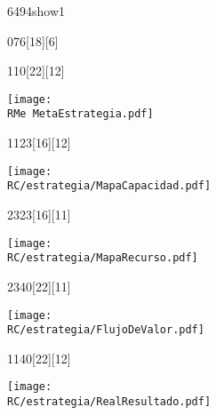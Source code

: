 \begin{NuevaPagina}{64}{94}{show1}
	\CabeceraDePoster{\MATERIA} 
	\begin{NuevoParrafo}{0}{76}[18][6]
		\begin{Marco}[\LineaSupC][\LineaInfC][\LineaIzqC][\LineaDerC][CBlanco]
		\end{Marco}
	\end{NuevoParrafo} 
	\CiudadFechaVolumen
	\begin{NuevoParrafo}{11}{0}[22][12]
		\begin{Marco}[\LineaSupC][\LineaInfC][\LineaIzqC][\LineaDerC][CBlanco]
			\centering\texttt{[image: \\RMe MetaEstrategia.pdf]}		
		\end{Marco}
	\end{NuevoParrafo}	
	\begin{NuevoParrafo}{11}{23}[16][12]
		\begin{Marco}[\LineaSupC][\LineaInfC][\LineaIzqC][\LineaDerC][CBlanco]
			\subseccionC{\PVMaC}%
			\centering\texttt{[image: \\RC/estrategia/MapaCapacidad.pdf]}		
		\end{Marco}
	\end{NuevoParrafo}	
	\begin{NuevoParrafo}{23}{23}[16][11]
		\begin{Marco}[\LineaSupC][\LineaInfC][\LineaIzqC][\LineaDerC][CBlanco]
			\subseccionC{\PVMaR}%
			\centering\texttt{[image: \\RC/estrategia/MapaRecurso.pdf]}		
		\end{Marco}
	\end{NuevoParrafo}	
		\begin{NuevoParrafo}{23}{40}[22][11]
		\begin{Marco}[\LineaSupC][\LineaInfC][\LineaIzqC][\LineaDerC][CBlanco]
			\subseccionC{\PVFdV}%
			\centering\texttt{[image: \\RC/estrategia/FlujoDeValor.pdf]}		
		\end{Marco}
	\end{NuevoParrafo}	
	\begin{NuevoParrafo}{11}{40}[22][12]
		\begin{Marco}[\LineaSupC][\LineaInfC][\LineaIzqC][\LineaDerC][CBlanco]
			\subseccionC{\PVRes}%
			\centering\texttt{[image: \\RC/estrategia/RealResultado.pdf]}		
		\end{Marco}
	\end{NuevoParrafo}	


\end{NuevaPagina}
